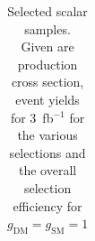 \begin{table}[h!]
\begin{tabular}{lllllll}
\hline
\end{tabular}
\caption{Selected scalar samples. Given are production cross section, event yields for 3~fb$^{-1 }$ for the various selections and the overall selection efficiency for $g_\textrm{DM}=g_\textrm{SM}=1$}
\label{tab:dm_S_g1_3fb}
\end{table}


